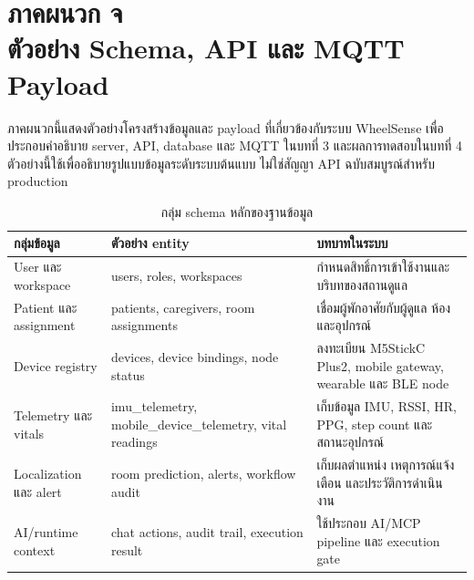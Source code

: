 \chapter[ตัวอย่าง Schema, API และ MQTT Payload]{\texorpdfstring{ภาคผนวก จ\\ตัวอย่าง Schema, API และ MQTT Payload}{Appendix E: Schema API and MQTT Payload}}
\label{app:schema_payload}

ภาคผนวกนี้แสดงตัวอย่างโครงสร้างข้อมูลและ payload ที่เกี่ยวข้องกับระบบ WheelSense เพื่อประกอบคำอธิบาย server, API, database และ MQTT ในบทที่ 3 และผลการทดสอบในบทที่ 4 ตัวอย่างนี้ใช้เพื่ออธิบายรูปแบบข้อมูลระดับระบบต้นแบบ ไม่ใช่สัญญา API ฉบับสมบูรณ์สำหรับ production

\begin{table}[H]
    \centering
    \caption{กลุ่ม schema หลักของฐานข้อมูล}
    \label{tab:app_schema_groups}
    \renewcommand{\arraystretch}{1.18}
    \small
    \setlength{\tabcolsep}{3pt}
    \begin{tabular}{|L{0.26\textwidth}|L{0.34\textwidth}|L{0.30\textwidth}|}
        \hline
        \textbf{กลุ่มข้อมูล} & \textbf{ตัวอย่าง entity} & \textbf{บทบาทในระบบ} \\ \hline
        User และ workspace & users, roles, workspaces & กำหนดสิทธิ์การเข้าใช้งานและบริบทของสถานดูแล \\ \hline
        Patient และ assignment & patients, caregivers, room assignments & เชื่อมผู้พักอาศัยกับผู้ดูแล ห้อง และอุปกรณ์ \\ \hline
        Device registry & devices, device bindings, node status & ลงทะเบียน M5StickC Plus2, mobile gateway, wearable และ BLE node \\ \hline
        Telemetry และ vitals & imu\_telemetry, mobile\_device\_telemetry, vital readings & เก็บข้อมูล IMU, RSSI, HR, PPG, step count และสถานะอุปกรณ์ \\ \hline
        Localization และ alert & room prediction, alerts, workflow audit & เก็บผลตำแหน่ง เหตุการณ์แจ้งเตือน และประวัติการดำเนินงาน \\ \hline
        AI/runtime context & chat actions, audit trail, execution result & ใช้ประกอบ AI/MCP pipeline และ execution gate \\ \hline
    \end{tabular}
\end{table}

